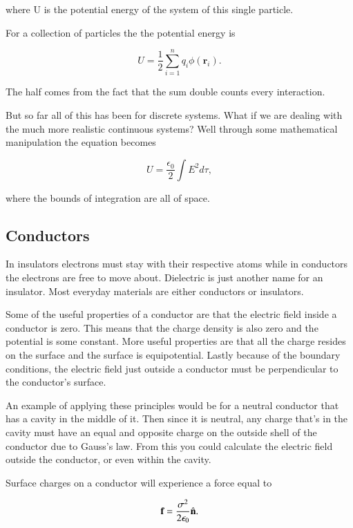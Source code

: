 \documentclass[preprint, review,12pt]{elsarticle}
\def\b{\textbf}
\begin{document}
where U is the potential energy of the system of this single particle.

For a collection of particles the the potential energy is

\begin{equation}
    U = \frac{1}{2}\sum_{i=1}^n q_i \phi(\b{r}_i).
\end{equation}

The half comes from the fact that the sum double counts every interaction.

But so far all of this has been for discrete systems. What if we are dealing with the much more realistic continuous systems? Well through some mathematical manipulation the equation becomes 

\begin{equation}
    U = \frac{\epsilon_0}{2}\int E^2 d\tau, 
\end{equation}

where the bounds of integration are all of space.

\subsection{Conductors}

In insulators electrons must stay with their respective atoms while in conductors the electrons are free to move about. Dielectric is just another name for an insulator. Most everyday materials are either conductors or insulators. 

Some of the useful properties of a conductor are that the electric field inside a conductor is zero. This means that the charge density is also zero and the potential is some constant. More useful properties are that all the charge resides on the surface and the surface is equipotential. Lastly because of the boundary conditions, the electric field just outside a conductor must be perpendicular to the conductor's surface. 

An example of applying these principles would be for a neutral conductor that has a cavity in the middle of it. Then since it is neutral, any charge that's in the cavity must have an equal and opposite charge on the outside shell of the conductor due to Gauss's law. From this you could calculate the electric field outside the conductor, or even within the cavity.

Surface charges on a conductor will experience a force equal to 

\begin{equation}
    \b{f} = \frac{\sigma^2}{2 \epsilon_0} \hat{\b n}.
\end{equation}
\end{document}
